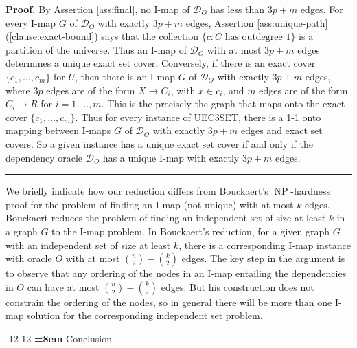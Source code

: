 \documentclass{elsarticle}%
\makeatletter
\renewcommand\section{\@startsection {section}{1}{\z@}%
  {-12\p@ \@plus -4\p@ \@minus -4\p@}%
                       {12\p@ \@plus 4\p@ \@minus 4\p@}%
                                   {\normalfont\large\bfseries\boldmath
                                   \rightskip=\z@ \@plus 8em\pretolerance=10000 }}
\renewenvironment{proof}[1][Proof]{\noindent\textbf{#1.} }{\ \rule{0.5em}{0.5em}}
\DeclareMathOperator{\NP}{\mathbf{\mathrm{NP}}}
\newcommand{\R}{R}
\newcommand{\X}{X}
\newcommand{\C}{C}
\newcommand{\U}{U}
\newcommand{\G}{G}
\newcommand{\D}{\mathcal{D}}
\renewcommand{\c}{c}
\newcommand{\x}{x}
\makeatother
\begin{document}
\begin{proof} By Assertion \ref{ass:final},
no I-map of $\D_{O}$ has less than $3p + m$ edges. For every I-map $\G$ of $\D_{O}$ with exactly $3p + m$ edges, Assertion \ref{ass:unique-path}(\ref{clause:exact-bound}) says that the collection $\{\c: \C \mbox{ has outdegree 1}\}$ is a partition of the universe. Thus an I-map of $\D_{O}$ with at most $3p+m$ edges determines a unique exact set cover. Conversely, if there is an exact cover $\{c_1,\ldots,c_{m}\}$ for $\U$, then there is an I-map $\G$ of $\D_{O}$ with exactly $3p + m$ edges, where $3p$ edges are of the form $\X \rightarrow \C_i$, with $\x \in \c_i$, and $m$ edges are of the form $\C_i \rightarrow \R$ for $i=1,\ldots,m$. This is the precisely the graph that maps onto the exact cover $\{c_1,\ldots,c_{m}\}$. Thus for every instance of \textsc{UEC3SET}, there is a 1-1 onto mapping between I-maps $\G$ of $\D_{O}$ with exactly $3p+m$ edges and exact set covers. So a given instance has a unique exact set cover if and only if the dependency oracle $\D_{O}$ has a unique I-map with exactly $3p+m$ edges.
\end{proof}

We briefly indicate how our reduction differs from Bouckaert's $\NP$-hardness proof for the
problem of finding an I-map (not unique) with at most $k$ edges. Bouckaert reduces the problem
of finding an independent set of size at least $k$ in a graph $G$ to the I-map problem. In Bouckaert's reduction, for a given graph $G$ with an independent set of size at
least $k$, there is a corresponding I-map instance with oracle $O$ with at most ${n\choose 2} - {k\choose 2}$ edges. The key step in the argument is to observe that any ordering of the nodes in an I-map entailing the dependencies in $O$ can have at most ${n\choose 2} - {k\choose 2}$ edges.
 But his construction does not constrain the ordering of the nodes,
 so in general there will be more than one I-map solution for the corresponding
 independent set problem.



\section{Conclusion}
\end{document}
